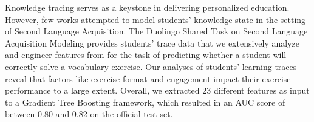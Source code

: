 Knowledge tracing serves as a keystone in delivering personalized education. However, few works attempted to model students' knowledge state in the setting of Second Language Acquisition. The Duolingo Shared Task on Second Language Acquisition Modeling provides students' trace data that we extensively analyze and engineer features from for the task of predicting whether a student will correctly solve a vocabulary exercise. Our analyses of students' learning traces reveal that factors like exercise format and engagement impact their exercise performance to a large extent. Overall, we extracted 23 different features as input to a Gradient Tree Boosting framework, which resulted in an AUC score of between 0.80 and 0.82 on the official test set.
